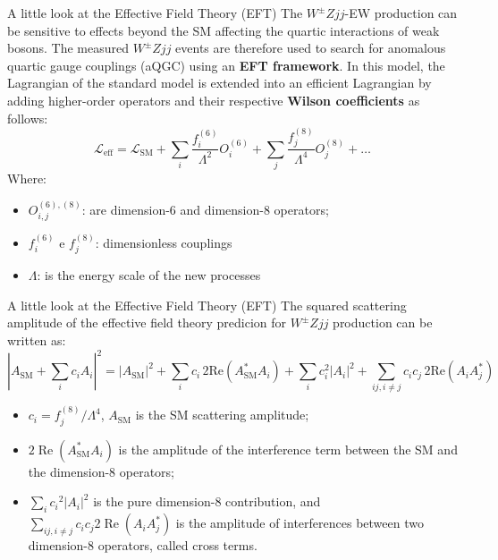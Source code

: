 \begin{frame}{A little look at the Effective Field Theory (EFT)}
    The $W^\pm Zjj$-EW production can be sensitive to effects beyond the SM affecting the quartic interactions of weak bosons. The measured $W^\pm Zjj$ events are therefore used to search for anomalous quartic gauge couplings (aQGC) using an \textbf{EFT framework}. In this model, the Lagrangian of the standard model is extended into an efficient Lagrangian by adding higher-order operators and their respective \textbf{Wilson coefficients} as follows:
    \begin{equation*}
        \mathcal{L}_{\mathrm{eff}} = \mathcal{L}_{\mathrm{SM}} + \sum_{i} \frac{f_{i}^{(6)}}{\Lambda^{2}} O_{i}^{(6)} + \sum_{j} \frac{f_{j}^{(8)}}{\Lambda^{4}} O_{j}^{(8)} + \dots 
    \end{equation*}
    Where:
    \begin{itemize}
        \item $O_{i,j}^{(6),(8)}$: are dimension-6 and dimension-8 operators;
        \item $f_{i}^{(6)}$ e $f_{j}^{(8)}$: dimensionless couplings
        \item $\Lambda$: is the energy scale of the new processes
    \end{itemize}
\end{frame}
\begin{frame}{A little look at the Effective Field Theory (EFT)}
    The squared scattering amplitude of the effective field theory predicion for $W^\pm Zjj$ production can be written as:
    \begin{equation*}
        \left| A_{\mathrm{SM}}+\sum_i c_i A_i \right|^2 = {\left| A_{\mathrm{SM}} \right| }^2 + \sum_i c_i \, 2 \mathrm{Re}(A^*_{\mathrm{SM}}A_i)+ \sum_i c_i^2 |A_i|^2 +\sum_{ij,i\neq j} c_i c_j \, 2 \mathrm{Re}(A_{i} A^*_{j})
    \end{equation*}
    \begin{itemize}
        \item $c_i = f_j^{(8)} / \Lambda^4$, $A_{\mathrm{SM}}$ is the SM scattering amplitude;
        \item $2 \operatorname{Re}(A^*_{\mathrm{SM}} A_i)$ is the amplitude of the interference term between the SM and the dimension-8 operators;
        \item $\sum_i {c_i}^2 |A_i|^2$ is the pure dimension-8 contribution, and $\sum_{ij,i\neq j} c_i c_j 2 \operatorname{Re}(A_i A^*_j)$ is the amplitude of interferences between two dimension-8 operators, called cross terms.
    \end{itemize}
\end{frame}

